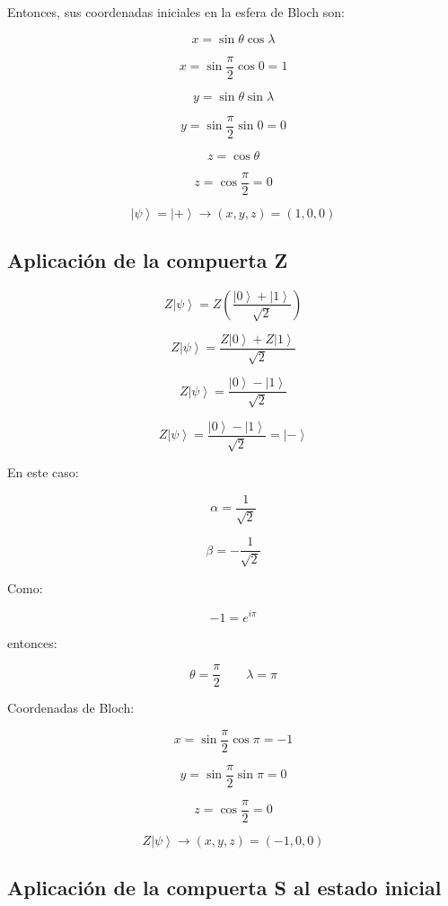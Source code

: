 \documentclass[12pt,a4paper]{article}
\newcommand{\ket}[1]{\left|#1\right\rangle}
\begin{document}
Entonces, sus coordenadas iniciales en la esfera de Bloch son:

\[
x=\sin\theta\cos\lambda
\]

\[
x=\sin\frac{\pi}{2}\cos 0=1
\]

\[
y=\sin\theta\sin\lambda
\]

\[
y=\sin\frac{\pi}{2}\sin 0=0
\]

\[
z=\cos\theta
\]

\[
z=\cos\frac{\pi}{2}=0
\]

\begin{resultado}
\[
\boxed{\ket{\psi}=\ket{+}\rightarrow(x,y,z)=(1,0,0)}
\]
\end{resultado}

\subsection{Aplicación de la compuerta Z}

\[
Z\ket{\psi}
=
Z\left(
\frac{\ket{0}+\ket{1}}{\sqrt{2}}
\right)
\]

\[
Z\ket{\psi}
=
\frac{Z\ket{0}+Z\ket{1}}{\sqrt{2}}
\]

\[
Z\ket{\psi}
=
\frac{\ket{0}-\ket{1}}{\sqrt{2}}
\]

\begin{resultado}
\[
\boxed{
Z\ket{\psi}
=
\frac{\ket{0}-\ket{1}}{\sqrt{2}}
=
\ket{-}
}
\]
\end{resultado}

En este caso:

\[
\alpha=\frac{1}{\sqrt{2}}
\]

\[
\beta=-\frac{1}{\sqrt{2}}
\]

Como:

\[
-1=e^{i\pi}
\]

entonces:

\[
\theta=\frac{\pi}{2}
\qquad
\lambda=\pi
\]

Coordenadas de Bloch:

\[
x=\sin\frac{\pi}{2}\cos\pi=-1
\]

\[
y=\sin\frac{\pi}{2}\sin\pi=0
\]

\[
z=\cos\frac{\pi}{2}=0
\]

\begin{resultado}
\[
\boxed{Z\ket{\psi}\rightarrow(x,y,z)=(-1,0,0)}
\]
\end{resultado}

\subsection{Aplicación de la compuerta S al estado inicial}
\end{document}
